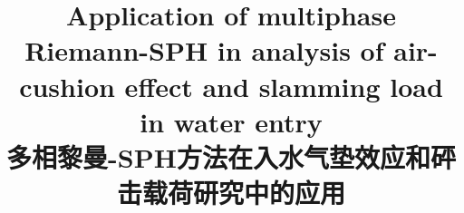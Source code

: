 \documentclass[UTF8]{ctexart}
\title{Application of multiphase Riemann-SPH in analysis of air-cushion effect and slamming load in water entry \\ 多相黎曼-SPH方法在入水气垫效应和砰击载荷研究中的应用}
\begin{document}
    
\pagebreak
















\end{document}
